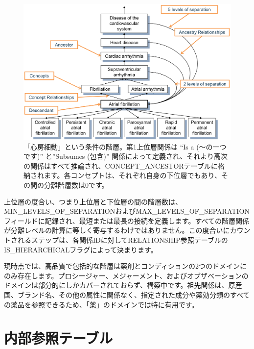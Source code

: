 \documentclass[
  11pt]{book}
\theoremstyle{definition}
\theoremstyle{definition}
\theoremstyle{definition}
\theoremstyle{definition}
\theoremstyle{remark}
\begin{document}
\begin{figure}

{\centering \includegraphics[width=1\linewidth]{images/StandardizedVocabularies/conceptAncestor} 

}

\caption{「心房細動」という条件の階層。第1上位層関係は ``Is a (～の一つです)'' と''Subsumes (包含)'' 関係によって定義され、それより高次の関係はすべて推論され、CONCEPT\_ANCESTORテーブルに格納されます。各コンセプトは、それぞれ自身の下位層でもあり、その間の分離階層数は0です。 }\label{fig:conceptAncestor}
\end{figure}

上位層の度合い、つまり上位層と下位層の間の階層数は、MIN\_LEVELS\_OF\_SEPARATIONおよびMAX\_LEVELS\_OF\_SEPARATIONフィールドに記録され、最短または最長の接続を定義します。すべての階層関係が分離レベルの計算に等しく寄与するわけではありません。この度合いにカウントされるステップは、各関係IDに対してRELATIONSHIP参照テーブルのIS\_HIERARCHICALフラグによって決まります。

現時点では、高品質で包括的な階層は薬剤とコンディションの2つのドメインにのみ存在します。プロシージャー、メジャーメント、およびオブザベーションのドメインは部分的にしかカバーされておらず、構築中です。祖先関係は、原産国、ブランド名、その他の属性に関係なく、指定された成分や薬効分類のすべての薬品を参照できるため、「薬」のドメインでは特に有用です。

\section{内部参照テーブル}\label{ux5185ux90e8ux53c2ux7167ux30c6ux30fcux30d6ux30eb}
\end{document}
